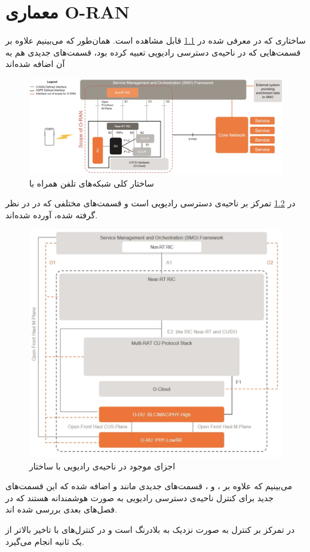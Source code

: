 \chapter{معماری
O-RAN
}

ساختاری که در 
معرفی شده در 
\ref{fig:oran}
قابل مشاهده است. همان‌طور که می‌بینیم علاوه بر قسمت‌هایی که 
در ناحیه‌ی دسترسی رادیویی تعبیه کرده بود، قسمت‌های جدیدی هم به آن اضافه شده‌اند 

\begin{figure}[H]
	\includegraphics[width=0.85\columnwidth]{Picture/oran.png}
	\centering
	\caption{ساختار کلی شبکه‌های تلفن همراه با
	}
	\label{fig:oran}
\end{figure}

در 
\ref{fig:oran2} 
تمرکز بر ناحیه‌ی دسترسی رادیویی است و قسمت‌های مختلفی که در
در نظر گرفته شده، آورده شده‌اند.

\begin{figure}[H]
	\includegraphics[width=0.85\columnwidth]{Picture/oran2.png}
	\centering
	\caption{اجزای موجود در ناحیه‌ی رادیویی با ساختار
	}
	\label{fig:oran2}
\end{figure}

می‌بینیم که علاوه بر 
،
و 
،
قسمت‌های جدیدی مانند 
و 
اضافه شده که این قسمت‌های جدید برای کنترل ناحیه‌ی دسترسی رادیویی به صورت هوشمندانه هستند که در فصل‌های بعدی بررسی شده اند.

در 
تمرکز بر کنترل به صورت نزدیک به بلادرنگ است و در 
کنترل‌های با تاخیر بالاتر از یک ثانیه انجام می‌گیرد. 


